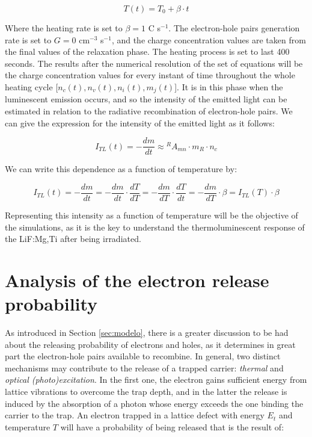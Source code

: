 \begin{equation} \label{eq:heating}
  T(t) = T_0 + \beta \cdot t
\end{equation}

\vspace{7pt}
Where the heating rate is set to $\beta = 1 $ \textdegree C s$^{-1}$. The electron-hole pairs generation rate is set to $G = 0$ cm$^{-3}$ s$^{-1}$, and the charge concentration values are taken from the final values of the relaxation phase. The heating process is set to last 400 seconds. The results after the numerical resolution of the set of equations will be the charge concentration values for every instant of time throughout the whole heating cycle [$n_c(t), n_v(t), n_i(t), m_j(t)$]. It is in this phase when the luminescent emission occurs, and so the intensity of the emitted light can be estimated in relation to the radiative recombination of electron-hole pairs. We can give the expression for the intensity of the emitted light as it follows:

\begin{equation} \label{eq:intensity}
  I_{T\!L}(t) = -\frac{dm}{dt} \approx {}^RA_{mn} \cdot m_R \cdot n_c
\end{equation}

\vspace{7pt}

We can write this dependence as a function of temperature by:

\begin{equation}
  I_{T\!L}(t) = -\frac{dm}{dt} = -\frac{dm}{dt} \cdot \frac{dT}{dT} = -\frac{dm}{dT} \cdot \frac{dT}{dt} = -\frac{dm}{dT} \cdot \beta = I_{T\!L}(T) \cdot \beta
\end{equation}

Representing this intensity as a function of temperature will be the objective of the simulations, as it is the key to understand the thermoluminescent response of the LiF:Mg,Ti after being irradiated.

\section{Analysis of the electron release probability} \label{sec:factorfrecuencia}

As introduced in Section \ref{sec:modelo}, there is a greater discussion to be had about the releasing probability of electrons and holes, as it determines in great part the electron-hole pairs available to recombine. In general, two distinct mechanisms may contribute to the release of a trapped carrier: \textit{thermal} and \textit{optical (photo)excitation}. In the first one, the electron gains sufficient energy from lattice vibrations to overcome the trap depth, and in the latter the release is induced by the absorption of a photon whose energy exceeds the one binding the carrier to the trap. An electron trapped in a lattice defect with energy $E_t$ and temperature $T$ will have a probability of being released that is the result of:

